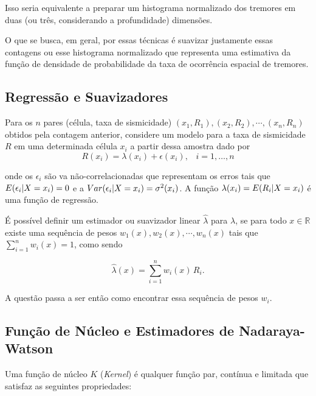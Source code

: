 Isso seria equivalente a preparar um histograma normalizado 
dos tremores em duas (ou três, considerando a profundidade) dimensões.

O que se busca, em geral, por essas técnicas é suavizar justamente essas contagens ou esse histograma
normalizado que representa uma estimativa da função de densidade de probabilidade da taxa de ocorrência espacial de tremores. 


\subsection{Regressão e Suavizadores}


Para os $n$ pares (célula, taxa de sismicidade) $(x_1, R_1), (x_2, R_2), \cdots, (x_n, R_n)$
obtidos pela contagem anterior, considere um modelo para a taxa de sismicidade $R$ 
em uma determinada célula $x_i$ a partir dessa amostra dado por
\begin{equation}
	\ensuremath{
		R(x_i) = \lambda(x_i) + \epsilon(x_i),\;\;\; i=1,\dots,n
	}
\label{eq:rate_model}
\end{equation}

onde os $\epsilon_i$ são \gls{va} não-correlacionadas que representam os erros 
tais que $E(\epsilon_i \arrowvert X = x_i) = 0$ 
e a  $Var(\epsilon_i \arrowvert X = x_i) = \sigma^2(x_i)$. A função  
$\lambda(x_i) = E(R_i \arrowvert X = x_i)$ é uma função de regressão.

É possível definir um estimador ou suavizador linear $\hat{\lambda}$ para $\lambda$, 
se para todo $x \in \mathbb{R}$ existe uma sequência de pesos $w_1(x), w_2(x),\cdots,w_n(x)$ tais que
$\sum_{i=1}^{n}w_i(x) = 1$, como sendo

\begin{equation}
	\ensuremath{
		\hat{\lambda}(x) = \sum_{i=1}^{n}w_i(x)\,R_i.
	}
\label{eq:rate_estim}
\end{equation}

A questão passa a ser então como encontrar essa sequência de pesos $w_i$.

\subsection{Função de Núcleo e Estimadores de Nadaraya-Watson}
\label{sec:nadaraya}
Uma função de núcleo $K$ (\emph{Kernel}) é qualquer função par, contínua e limitada que satisfaz as seguintes
propriedades:

